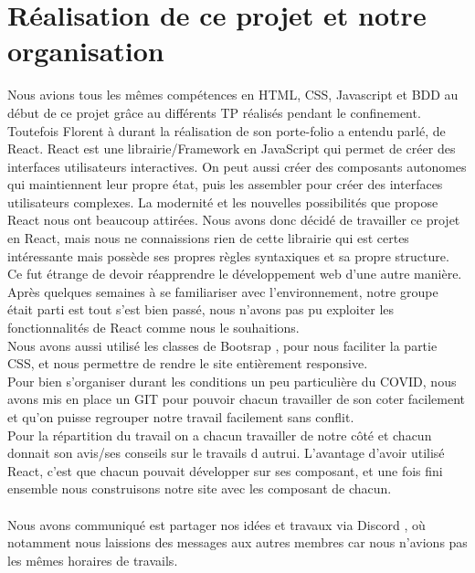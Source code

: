 \documentclass[12pt]{report}
\begin{document}
\section{Réalisation de ce projet et notre organisation}
	Nous avions tous les mêmes compétences en HTML, CSS, Javascript et BDD au début de ce projet grâce au différents TP réalisés pendant le confinement. Toutefois Florent à durant la réalisation de son porte-folio a entendu parlé, de React. React\cite{React} est une librairie/Framework en JavaScript qui permet de créer des interfaces utilisateurs interactives. On peut aussi créer des composants autonomes qui maintiennent leur propre état, puis les assembler pour créer des interfaces utilisateurs complexes. La modernité et les nouvelles possibilités que propose React nous ont beaucoup attirées. Nous avons donc décidé de travailler ce projet en React, mais nous ne connaissions rien de cette librairie qui est certes intéressante mais possède ses propres règles syntaxiques et sa propre structure. Ce fut étrange de devoir réapprendre le développement web d'une autre manière. Après quelques semaines à se familiariser avec l'environnement, notre groupe était parti est tout s'est bien passé, nous n'avons pas pu exploiter les fonctionnalités de React comme nous le souhaitions. \\
	Nous avons aussi utilisé les classes de Bootsrap \cite{Bootsrap}, pour nous faciliter la partie CSS, et nous permettre de rendre le site entièrement responsive.\\
	Pour bien s'organiser durant les conditions un peu particulière du COVID, nous avons mis en place un GIT pour pouvoir chacun travailler de son coter facilement et qu'on puisse regrouper notre travail facilement sans conflit.\\
	Pour la répartition du travail on a chacun travailler de notre côté et chacun donnait son avis/ses conseils sur le travails d autrui. L'avantage d'avoir utilisé React, c'est que chacun pouvait développer sur ses composant, et une fois fini ensemble nous construisons notre site avec les composant de chacun.\\
	\\
	Nous avons communiqué est partager nos idées et travaux via Discord \cite{Discord}, où notamment nous laissions des messages aux autres membres car nous n'avions pas les mêmes horaires de travails.
\end{document}
